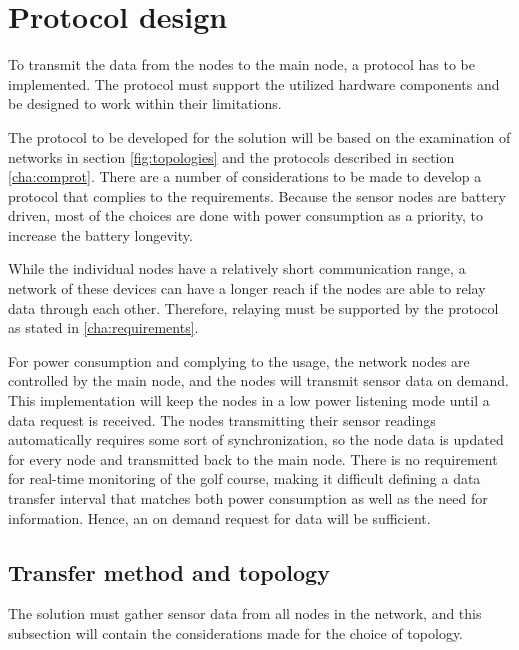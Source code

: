 \section{Protocol design}\label{cha:protocolDesign}
To transmit the data from the nodes to the main node, a protocol has to be implemented.
The protocol must support the utilized hardware components and be designed to work within their limitations. 

The protocol to be developed for the solution will be based on the examination of networks in section \ref{fig:topologies} and the protocols described in section \ref{cha:comprot}.
There are a number of considerations to be made to develop a protocol that complies to the requirements.
Because the sensor nodes are battery driven, most of the choices are done with power consumption as a priority, to increase the battery longevity.

While the individual nodes have a relatively short communication range, a network of these devices can have a longer reach if the nodes are able to relay data through each other.
Therefore, relaying must be supported by the protocol as stated in \ref{cha:requirements}. 

For power consumption and complying to the usage, the network nodes are controlled by the main node, and the nodes will transmit sensor data on demand.
This implementation will keep the nodes in a low power listening mode until a data request is received.
The nodes transmitting their sensor readings automatically requires some sort of synchronization, so the node data is updated for every node and transmitted back to the main node.
There is no requirement for real-time monitoring of the golf course, making it difficult defining a data transfer interval that matches both power consumption as well as the need for information.
Hence, an on demand request for data will be sufficient.

\subsection{Transfer method and topology}
The solution must gather sensor data from all nodes in the network, and this subsection will contain the considerations made for the choice of topology.

